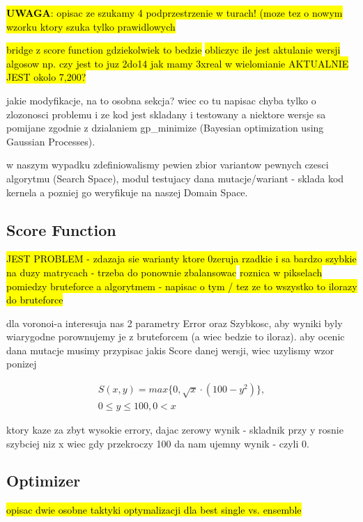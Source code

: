 \documentclass[format=acmsmall,screen,review,authordraft,nonacm]{acmart}
\begin{document}
\hl{\textbf{UWAGA}: opisac ze szukamy 4 podprzestrzenie w turach! (moze tez o
nowym wzorku ktory szuka tylko prawidlowych}

\hl{bridge z score function gdziekolwiek to bedzie}
\hl{obliczyc ile jest aktulanie wersji algosow np. czy jest to juz 2do14 jak
mamy 3xreal w wielomianie AKTUALNIE JEST okolo 7,200?}

jakie modyfikacje, na to osobna sekcja? wiec co tu napisac
chyba tylko o zlozonosci problemu i ze kod jest skladany i testowany a niektore
wersje sa pomijane zgodnie z dzialaniem gp\_minimize (Bayesian optimization
using Gaussian Processes).

w naszym wypadku zdefiniowalismy pewien zbior variantow pewnych czesci
algorytmu (Search Space), modul testujacy dana mutacje/wariant - sklada kod kernela a pozniej go weryfikuje na naszej Domain Space.

\subsection{Score Function} %

\hl{JEST PROBLEM - zdazaja sie warianty ktore 0zeruja rzadkie i sa bardzo
szybkie na duzy matrycach - trzeba do ponownie zbalansowac}
\hl{roznica w pikselach pomiedzy bruteforce a algorytmem - napisac o tym / tez
ze to wszystko to ilorazy do bruteforce}

dla voronoi-a interesuja nas 2 parametry Error oraz Szybkosc, aby wyniki byly
wiarygodne porownujemy je z bruteforcem (a wiec bedzie to iloraz).
aby ocenic dana mutacje musimy przypisac jakis Score danej wersji, wiec uzylismy
wzor ponizej

\begin{align}
	S(x,y) = max\{0, \sqrt{x} \cdot (100-y^{2})\}, \\
0 \leq y \leq 100, 0 < x
\end{align}

ktory kaze za zbyt wysokie errory, dajac zerowy wynik - skladnik przy y rosnie
szybciej niz x wiec gdy przekroczy 100 da nam ujemny wynik - czyli 0.

\subsection{Optimizer} %

\hl{opisac dwie osobne taktyki optymalizacji dla best single vs. ensemble}
\end{document}
